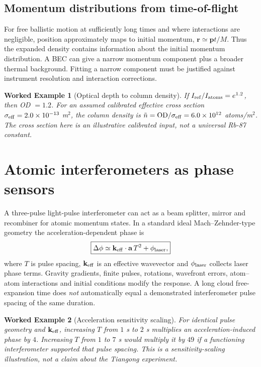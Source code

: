 \documentclass[11pt,a4paper]{article}
\newtheorem{example}{Worked Example}
\begin{document}
\subsection{Momentum distributions from time-of-flight}
For free ballistic motion at sufficiently long times and where interactions are negligible, position approximately maps to initial momentum, $\mathbf r\simeq\mathbf p t/M$. Thus the expanded density contains information about the initial momentum distribution. A BEC can give a narrow momentum component plus a broader thermal background. Fitting a narrow component must be justified against instrument resolution and interaction corrections.

\begin{example}[Optical depth to column density]
If $I_{\rm ref}/I_{\rm atoms}=e^{1.2}$, then OD $=1.2$. For an assumed calibrated effective cross section $\sigma_{\rm eff}=2.0\times10^{-13}$ m$^2$, the column density is $\tilde n=\mathrm{OD}/\sigma_{\rm eff}=6.0\times10^{12}$ atoms/m$^2$. The cross section here is an illustrative calibrated input, not a universal Rb-87 constant.
\end{example}

\section{Atomic interferometers as phase sensors}
A three-pulse light-pulse interferometer can act as a beam splitter, mirror and recombiner for atomic momentum states. In a standard ideal Mach--Zehnder-type geometry the acceleration-dependent phase is
\begin{equation}\boxed{\Delta\phi\simeq\mathbf k_{\rm eff}\cdot\mathbf a\,T^2+\phi_{\rm laser},}\end{equation}
where $T$ is pulse spacing, $\mathbf k_{\rm eff}$ is an effective wavevector and $\phi_{\rm laser}$ collects laser phase terms. Gravity gradients, finite pulses, rotations, wavefront errors, atom--atom interactions and initial conditions modify the response. A long cloud free-expansion time does \emph{not} automatically equal a demonstrated interferometer pulse spacing of the same duration.

\begin{example}[Acceleration sensitivity scaling]
For identical pulse geometry and $\mathbf k_{\rm eff}$, increasing $T$ from $1$ s to $2$ s multiplies an acceleration-induced phase by $4$. Increasing $T$ from $1$ to $7$ s would multiply it by $49$ \emph{if} a functioning interferometer supported that pulse spacing. This is a sensitivity-scaling illustration, not a claim about the Tiangong experiment.
\end{example}
\end{document}
